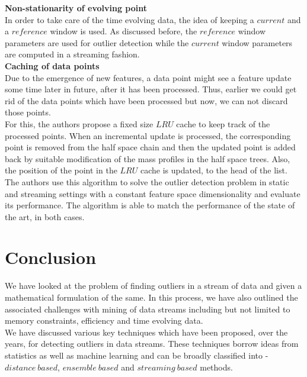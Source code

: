 \noindent \textbf{Non-stationarity of evolving point} \\

In order to take care of the time evolving data, the idea of keeping a $current$ and a $reference$ window is used. As discussed before, the $reference$ window parameters are used for outlier detection while the $current$ window parameters are computed in a streaming fashion. \\

\noindent \textbf{Caching of data points} \\

Due to the emergence of new features, a data point might see a feature update some time later in future, after it has been processed. Thus, earlier we could get rid of the data points which have been processed but now, we can not discard those points. \\

For this, the authors propose a fixed size $LRU$ cache to keep track of the processed points. When an incremental update is processed, the corresponding point is removed from the half space chain and then the updated point is added back by suitable modification of the mass profiles in the half space trees. Also, the position of the point in the $LRU$ cache is updated, to the head of the list. \\

The authors use this algorithm to solve the outlier detection problem in static and streaming settings with a constant feature space dimensionality and evaluate its performance. The algorithm is able to match the performance of the state of the art, in both cases.

\section{Conclusion}

We have looked at the problem of finding outliers in a stream of data and given a mathematical formulation of the same. In this process, we have also outlined the associated challenges with mining of data streams including but not limited to memory constraints, efficiency and time evolving data. \\

We have discussed various key techniques which have been proposed, over the years, for detecting outliers in data streams. These techniques borrow ideas from statistics as well as machine learning and can be broadly classified into - $distance\ based$, $ensemble\ based$ and $streaming\ based$ methods. \\

